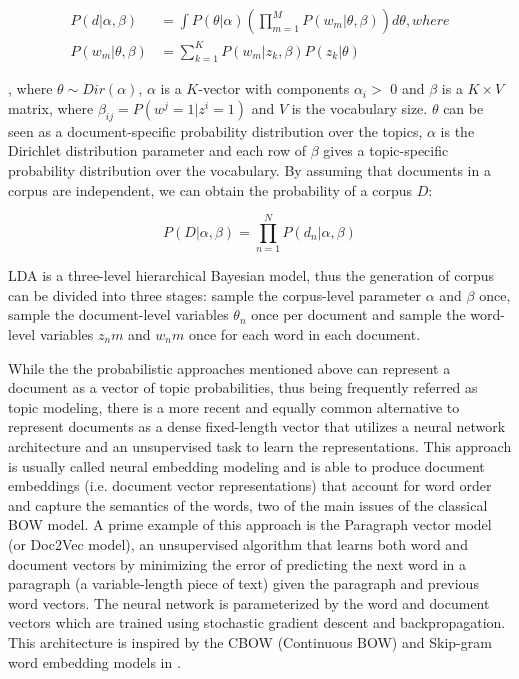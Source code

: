 \documentclass[a4paper]{article}
\begin{document}
\begin{subequations}
	\begin{align}
		P(d|\alpha,\beta) & = \int P(\theta|\alpha)\left(\prod_{m=1}^M P(w_m|\theta,\beta)\right) d\theta, where \\
		P(w_m|\theta,\beta) & = \sum_{k=1}^K P(w_m|z_k,\beta)P(z_k|\theta)
	\end{align}
\end{subequations}

, where $\theta \sim Dir(\alpha)$, $\alpha$ is a $K$-vector with components $\alpha_i >$ 0 and $\beta$ is a $K\times V$ matrix, where $\beta_{ij}=P(w^j=1|z^i=1)$ and $V$ is the vocabulary size. $\theta$ can be seen as a document-specific probability distribution over the topics, $\alpha$ is the Dirichlet distribution parameter and each row of $\beta$ gives a topic-specific probability distribution over the vocabulary. By assuming that documents in a corpus are independent, we can obtain the probability of a corpus $D$:

\begin{equation}
	P(D|\alpha,\beta) = \prod_{n=1}^N P(d_n|\alpha, \beta)
\end{equation}

LDA is a three-level hierarchical Bayesian model, thus the generation of corpus can be divided into three stages: sample the corpus-level parameter $\alpha$ and $\beta$ once, sample the document-level variables $\theta_n$ once per document and sample the word-level variables $z_nm$ and $w_nm$ once for each word in each document.

While the the probabilistic approaches mentioned above can represent a document as a vector of topic probabilities, thus being frequently referred as topic modeling, there is a more recent and equally common alternative to represent documents as a dense fixed-length vector that utilizes a neural network architecture and an unsupervised task to learn the representations. This approach is usually called neural embedding modeling and is able to produce document embeddings (i.e. document vector representations) that account for word order and capture the semantics of the words, two of the main issues of the classical BOW model. A prime example of this approach is the Paragraph vector model \citep{le2014} (or Doc2Vec model), an unsupervised algorithm that learns both word and document vectors by minimizing the error of predicting the next word in a paragraph (a variable-length piece of text) given the paragraph and previous word vectors. The neural network is parameterized by the word and document vectors which are trained using stochastic gradient descent and backpropagation. This architecture is inspired by the CBOW (Continuous BOW) and Skip-gram word embedding models in \citet{mikolov2013}.
\end{document}
